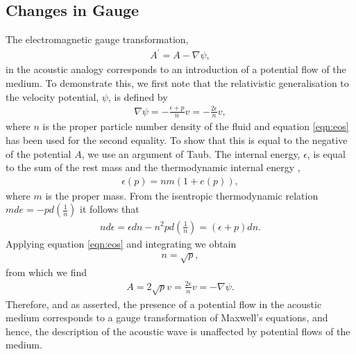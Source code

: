 \documentclass[10pt, fleqn,final,showtrims,oldfontcommands]{article} %
\newcommand{\eqnref}[1]{\ref{eqn:#1}}
\newcommand{\lr}[1]{\left( #1 \right)}
\newcommand{\del}{\nabla}
\newcommand{\vJ}{\vect J}
\newcommand{\vect}[1]{\mathbf{#1}}
\newcommand{\vu}{\textbf{u}}
\begin{document}


\subsection{Changes in Gauge}


The electromagnetic gauge transformation,
\begin{align}
  A^\prime = A - \del \psi,
\end{align}
in the acoustic analogy corresponds to an introduction of a potential flow of the medium.
To demonstrate this, we first note that the relativistic generalisation to the velocity potential, $\psi$,  is defined by\cite{LandauBook}
\begin{align}
  \del \psi = - \frac{\epsilon+p}{n} v = - \frac{2\epsilon}{n} v,
\end{align}
where $n$ is the proper particle number density of the fluid and equation \eqnref{eos} has been used for the second equality.
To show that this is equal to the negative of the potential $A$, we use an argument of Taub\cite{Taub1978}.
The internal energy, $\epsilon$, is equal to the sum of the rest mass and the thermodynamic internal energy \cite{LandauBook, Doran2003},
\begin{align}
  \epsilon(p) = nm( 1 + e(p)),
\end{align}
where $m$ is the proper mass.
From the isentropic thermodynamic relation $m de = - p d\lr{\frac{1}{n}}$
it follows that 
\begin{align}
 n d\epsilon = \epsilon dn - n^2 p d \lr{\frac{1}{n}} = \lr{\epsilon + p} dn.
\end{align}
Applying equation \eqnref{eos} and integrating we obtain
\begin{align}
n = \sqrt p,
\end{align}
from which we find
\begin{align}
A = 2\sqrt p  v = \frac{2\epsilon}{n} v = - \del \psi.
\end{align}
Therefore, and as asserted, the presence of a potential flow in the acoustic medium corresponds to a gauge transformation of Maxwell's equations,
and hence, the description of the acoustic wave is unaffected by potential flows of the medium.
\end{document}
